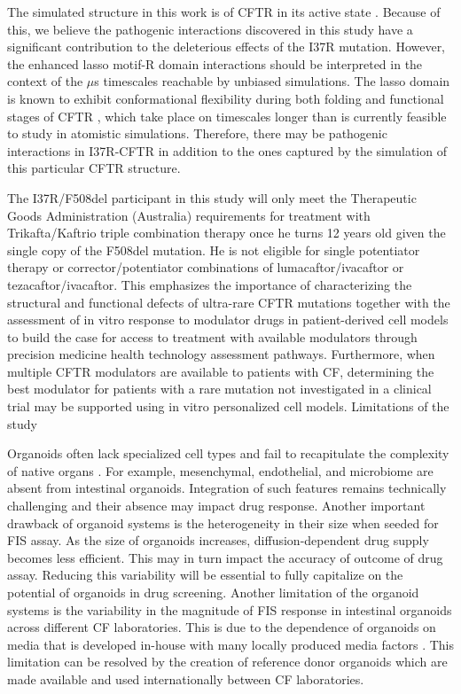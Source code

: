 The simulated structure in this work is of CFTR in its active state \cite{zhang2018a}. Because of this, we believe the pathogenic interactions discovered in this study have a significant contribution to the deleterious effects of the I37R mutation. However, the enhanced lasso motif-R domain interactions should be interpreted in the context of the $\mu$s timescales reachable by unbiased simulations. The lasso domain is known to exhibit conformational flexibility during both folding and functional stages of CFTR \cite{kleizen2021}, which take place on timescales longer than is currently feasible to study in atomistic simulations. Therefore, there may be pathogenic interactions in I37R-CFTR in addition to the ones captured by the simulation of this particular CFTR structure.

The I37R/F508del participant in this study will only meet the Therapeutic Goods Administration (Australia) requirements for treatment with Trikafta/Kaftrio triple combination therapy once he turns 12 years old given the single copy of the F508del mutation. He is not eligible for single potentiator therapy or corrector/potentiator combinations of lumacaftor/ivacaftor or tezacaftor/ivacaftor. This emphasizes the importance of characterizing the structural and functional defects of ultra-rare CFTR mutations together with the assessment of in vitro response to modulator drugs in patient-derived cell models to build the case for access to treatment with available modulators through precision medicine health technology assessment pathways. Furthermore, when multiple CFTR modulators are available to patients with CF, determining the best modulator for patients with a rare mutation not investigated in a clinical trial may be supported using in vitro personalized cell models.
Limitations of the study

Organoids often lack specialized cell types and fail to recapitulate the complexity of native organs \cite{clevers2016}. For example, mesenchymal, endothelial, and microbiome are absent from intestinal organoids. Integration of such features remains technically challenging and their absence may impact drug response. Another important drawback of organoid systems is the heterogeneity in their size when seeded for FIS assay. As the size of organoids increases, diffusion-dependent drug supply becomes less efficient. This may in turn impact the accuracy of outcome of drug assay. Reducing this variability will be essential to fully capitalize on the potential of organoids in drug screening. Another limitation of the organoid systems is the variability in the magnitude of FIS response in intestinal organoids across different CF laboratories. This is due to the dependence of organoids on media that is developed in-house with many locally produced media factors \cite{dekkers2016,ramalho2021}. This limitation can be resolved by the creation of reference donor organoids which are made available and used internationally between CF laboratories.

